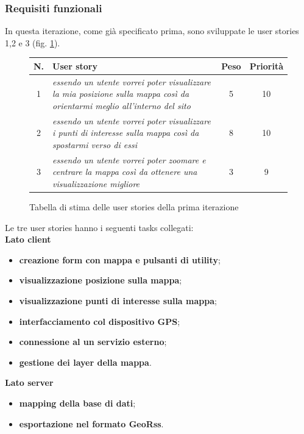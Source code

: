 \subsubsection{Requisiti funzionali}
In questa iterazione, come già specificato prima, sono sviluppate le user stories 1,2 e 3 (fig. \ref{userstoriestableprimaiterazione}). \\
\begin{figure}[h!]
\begin{center}
\begin{tabular}[c]{|c|p{7cm}|c|c|}
\hline
N. & User story & Peso & Priorità\\
\hline
1 & \textit{essendo un utente vorrei poter visualizzare la mia posizione sulla mappa così da orientarmi meglio all'interno del sito} & 5 & 10\\
\hline
2 & \textit{essendo un utente vorrei poter visualizzare i punti di interesse sulla mappa così da spostarmi verso di essi} & 8 & 10\\
\hline
3 & \textit{essendo un utente vorrei poter zoomare e centrare la mappa così da ottenere una visualizzazione migliore} & 3 & 9\\
\hline
\end{tabular}
\caption{Tabella di stima delle user stories della prima iterazione\label{userstoriestableprimaiterazione}}
\end{center}
\end{figure}
\clearpage

Le tre user stories hanno i seguenti tasks collegati:\\
\textbf{Lato client}
\begin{itemize}
\item \textbf{creazione form con mappa e pulsanti di utility};
\item \textbf{visualizzazione posizione sulla mappa};
\item \textbf{visualizzazione punti di interesse sulla mappa};
\item \textbf{interfacciamento col dispositivo GPS};
\item \textbf{connessione al un servizio esterno};
\item \textbf{gestione dei layer della mappa}.
\end{itemize}

\textbf{Lato server}
\begin{itemize}
\item \textbf{mapping della base di dati};
\item \textbf{esportazione nel formato GeoRss}.
\end{itemize}

